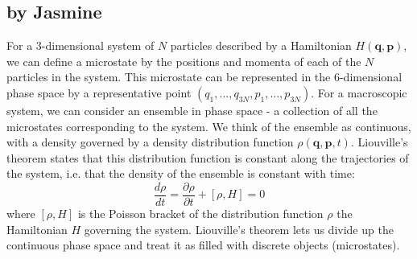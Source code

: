 \subsection{by Jasmine}

For a 3-dimensional system of $N$ particles described by a Hamiltonian $H(\mathbf{q}, \mathbf{p})$, we can define a microstate by the positions and momenta of each of the $N$ particles in the system. This microstate can be represented in the 6-dimensional phase space by a representative point $(q_1, \ldots, q_{3N}, p_1, \ldots, p_{3N} )$. For a macroscopic system, we can consider an ensemble in phase space - a collection of all the microstates corresponding to the system. We think of the ensemble as continuous, with a density governed by a density distribution function $\rho (\mathbf{q}, \mathbf{p}, t) $. Liouville's theorem states that this distribution function is constant along the trajectories of the system, i.e. that the density of the ensemble is constant with time: \[ \frac{d\rho}{dt} = \frac{\partial\rho}{\partial t} + [\rho, H]=0 \]
where $[\rho, H]$ is the Poisson bracket of the distribution function $\rho$ the Hamiltonian $H$ governing the system. Liouville's theorem lets us divide up the continuous phase space and treat it as filled with discrete objects (microstates).